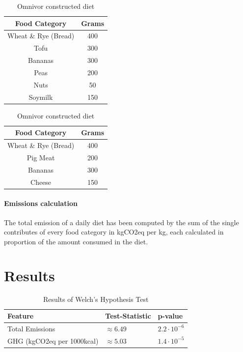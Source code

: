 \documentclass{article}
\begin{document}
\begin{table}
\parbox{.45\linewidth}{
  \caption{Plant based constructed diet}
\centering
\begin{tabular}{c c}
\toprule
Food Category & Grams\\
\midrule
Wheat \& Rye (Bread) & 400\\
Tofu & 300\\
Bananas & 300\\
Peas & 200\\
Nuts & 50\\
Soymilk & 150\\
\bottomrule
\end{tabular}
\label{tbl:plantdiet}
}
\hfill
\parbox{.45\linewidth}{
  \caption{Omnivor constructed diet}
\centering
\begin{tabular}{c c}
\toprule
Food Category & Grams\\
\midrule
Wheat \& Rye (Bread) & 400\\
Pig Meat & 200\\
Bananas & 300\\
Cheese & 150\\
\bottomrule
\end{tabular}
\label{tbl:omnidiet}
}
\end{table}

\paragraph*{Emissions calculation} The total emission of a daily diet has been computed by the sum of the single contributes of every food category in kgCO2eq per kg, each calculated in proportion of the amount consumed in the diet.

\section{Results}
\begin{table}[h]
  \caption{Results of  Welch's Hypothesis Test}
  \label{tbl:results-test}
  \centering
  \begin{tabular}{lll}
    \toprule
    Feature     & Test-Statistic   & p-value  \\
    \midrule
    Total Emissions &$\approx 6.49$  & $ 2.2\cdot10^{-6}  $  \\
    GHG (kgCO2eq per 1000kcal)    & $\approx 5.03 $  & $ 1.4\cdot10^{-5}$    \\
    \bottomrule
  \end{tabular}
\end{table}
\end{document}

